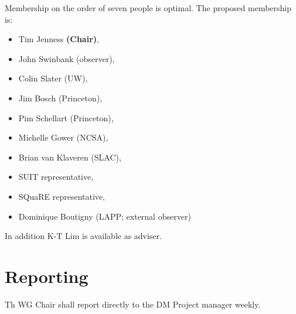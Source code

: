 Membership on the order of seven people is optimal.
The proposed membership is:

\begin{itemize}
  \item Tim Jenness \textbf{(Chair)},
  \item John Swinbank (observer),
  \item Colin Slater (UW),
  \item Jim Bosch (Princeton),
  \item Pim Schellart (Princeton),
  \item Michelle Gower (NCSA),
  \item Brian van Klaveren (SLAC),
  \item SUIT representative,
  \item SQuaRE representative,
  \item Dominique Boutigny (LAPP; external observer)
\end{itemize}

In addition K-T Lim is available as adviser.

\section{Reporting}

Th WG Chair shall report directly to the DM Project manager weekly.
